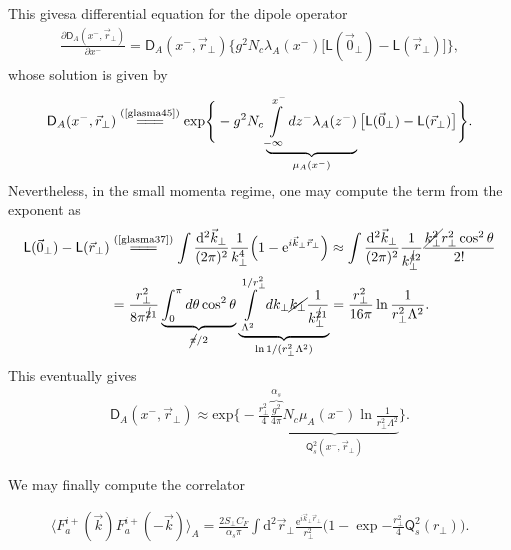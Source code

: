 \begin{note}
    \newpage
    
    This givesa differential equation for the dipole operator
    \begin{align*}
        \frac{\partial\textsf{D}_A(x^-,\vec{r}_\perp)}{\partial x^-}=\textsf{D}_A(x^-,\vec{r}_\perp)\Big\{g^2N_c\lambda_A(x^-)\big[\textsf{L}(\vec{0}_\perp)-\textsf{L}(\vec{r}_\perp)\big]\Big\},
    \end{align*}
    whose solution is given by
    \begin{align*}
        \textsf{D}_A(x^-,\vec{r}_\perp)\stackrel{(\text{\cref{glasma45}})}{=\joinrel=\joinrel=}\mathrm{exp}\Bigg\{-g^2N_c\underbrace{\int\limits_{-\infty}^{x^-}dz^-\lambda_A(z^-)}_{\mu_A(x^-)}\big[\textsf{L}(\vec{0}_\perp)-\textsf{L}(\vec{r}_\perp)\big]\Bigg\}.
    \end{align*}
    Nevertheless, in the small momenta regime, one may compute the term from the exponent as
    \begin{align*}
        \textsf{L}(\vec{0}_\perp)-\textsf{L}(\vec{r}_\perp)&\stackrel{(\text{\cref{glasma37}})}{=\joinrel=\joinrel=}\int \frac{\mathrm{d}^{2} \vec{k}_{\perp}}{(2 \pi)^{2}} \frac{1}{k_{\perp}^{4}}\Big(1-\mathrm{e}^{i \vec{k}_{\perp}\vec{r}_\perp}\Big)\approx\int\frac{\mathrm{d}^2 \vec{k}_\perp}{(2 \pi)^2} \frac{1}{k_\perp^{\cancel{4}2}} \frac{\cancel{k_{\perp}^2} r_\perp^2 \cos ^2 \theta}{2 !}\\
        &=\frac{r_\perp^2}{8\pi^{\cancel{2}1}}\underbrace{\int_0^{\pi}d\theta\cos^2\theta}_{\cancel{\pi}/2}\underbrace{\int\limits_{\Lambda^2}^{1/r_\perp^2}dk_\perp \cancel{k_\perp}\frac{1}{k_\perp^{\cancel{2}1}}}_{\ln{1/(r_\perp^2\Lambda^2)}}=\frac{r_\perp^2}{16\pi}\ln{\frac{1}{r_\perp^2\Lambda^2}}.
    \end{align*}
    This eventually gives
    \begin{align}\label{glasma47}
        \textsf{D}_A(x^-,\vec{r}_\perp)\approx\mathrm{exp}\Bigg\{-\frac{r_\perp^2}{4}\underbrace{\overbrace{\frac{g^2}{4\pi}}^{\alpha_s}N_c\mu_A(x^-)\ln{\frac{1}{r_\perp^2\Lambda^2}}}_{\textsf{Q}_s^2(x^-,\vec{r}_\perp)}\Bigg\}.
    \end{align}
\end{note}

We may finally compute the correlator
\begin{fullwidth}
\begin{align}\label{glasma50}
    \langle F_{a}^{i+}(\vec{k}) F_{a}^{i+}(-\vec{k})\rangle_A=\frac{2S_\perp C_F}{\alpha_s\pi}\int\mathrm{d}^2\vec{r}_\perp\frac{\mathrm{e}^{i\vec{k}_\perp\vec{r}_\perp}}{r_\perp^2}\Big(1-\exp{-\frac{r_\perp^2}{4}\textsf{Q}_s^2(r_\perp)}\Big).
\end{align}
\end{fullwidth}

